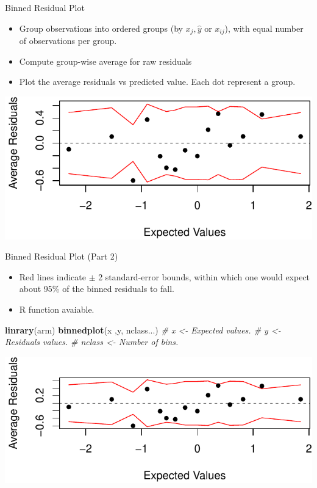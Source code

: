 \documentclass[ignorenonframetext,]{beamer}
\newenvironment{Shaded}{\begin{snugshade}}{\end{snugshade}}
\newcommand{\KeywordTok}[1]{\textcolor[rgb]{0.13,0.29,0.53}{\textbf{#1}}}
\newcommand{\CommentTok}[1]{\textcolor[rgb]{0.56,0.35,0.01}{\textit{#1}}}
\newcommand{\NormalTok}[1]{#1}
\providecommand{\tightlist}{%
  \setlength{\itemsep}{0pt}\setlength{\parskip}{0pt}}
\begin{document}
\begin{frame}{Binned Residual Plot}

\begin{itemize}
\tightlist
\item
  Group observations into ordered groups (by \(x_j, \hat{y}\) or
  \(x_{ij}\)), with equal number of observations per group.\\
\item
  Compute group-wise average for raw residuals\\
\item
  Plot the average residuals vs predicted value. Each dot represent a
  group.
\end{itemize}

\includegraphics{lec7_files/figure-beamer/unnamed-chunk-2-1.pdf}

\end{frame}

\begin{frame}[fragile]{Binned Residual Plot (Part 2)}

\begin{itemize}
\tightlist
\item
  Red lines indicate \(\pm\) 2 standard-error bounds, within which one
  would expect about 95\% of the binned residuals to fall.
\item
  R function avaiable.
\end{itemize}

\begin{Shaded}
\begin{Highlighting}[]
\KeywordTok{linrary}\NormalTok{(arm)}
\KeywordTok{binnedplot}\NormalTok{(x ,y, nclass...)}
\CommentTok{# x <- Expected values.  # y <- Residuals values.}
\CommentTok{# nclass <- Number of bins.     }
\end{Highlighting}
\end{Shaded}

\includegraphics{lec7_files/figure-beamer/unnamed-chunk-4-1.pdf}

\end{frame}
\end{document}
